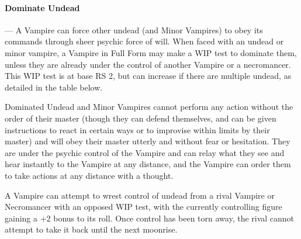 \documentclass[oneside,11pt,english]{book}
\begin{document}
\paragraph{Dominate Undead}---\quad
A Vampire can force other undead (and Minor Vampires) to obey its commands through sheer 
psychic force of will. When faced with an undead or minor vampire, a Vampire in Full Form may 
make a WIP test to dominate them, unless they are already under the control of another 
Vampire or a necromancer.
This WIP test is at base RS 2, but can increase if there are multiple undead, as detailed in the 
table below. 

Dominated Undead and Minor Vampires cannot perform any action without the order of their 
master (though they can defend themselves, and can be given instructions to react in certain 
ways or to improvise within limits by their master) and will obey their master utterly and without 
fear or hesitation. They are under the psychic control of the Vampire and can relay what they 
see and hear instantly to the Vampire at any distance, and the Vampire can order them to take 
actions at any distance with a thought. 

A Vampire can attempt to wrest control of undead from a rival Vampire or Necromancer with an 
opposed WIP test, with the currently controlling figure gaining a +2 bonus to its roll. Once 
control has been torn away, the rival cannot attempt to take it back until the next moonrise. 
\end{document}
